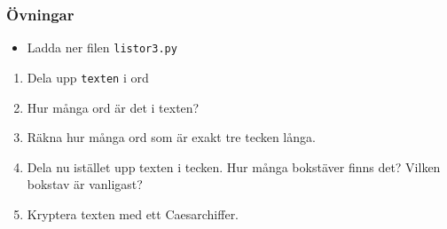 \documentclass[aspectratio=169]{beamer}
\begin{document}
\begin{frame}
	\frametitle{Övningar}
	
	\begin{itemize}
		\item Ladda ner filen \texttt{listor3.py}
	\end{itemize}

	\begin{enumerate}
		\item Dela upp \texttt{texten} i ord
		\item Hur många ord är det i texten?
		\item Räkna hur många ord som är exakt tre tecken långa.
		\item Dela nu istället upp texten i tecken. Hur många bokstäver finns det? Vilken bokstav är vanligast?
		\item Kryptera texten med ett Caesarchiffer.
	\end{enumerate}

\end{frame}
\end{document}
